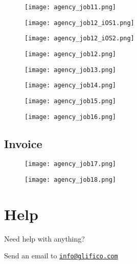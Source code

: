 \documentclass[11 pt, a4paper]{article}
\begin{document}
\begin{figure}[H]
\centering
\texttt{[image: agency\_job11.png]}
\end{figure}


\clearpage

\begin{figure}
\begin{minipage}{0.45\linewidth}
\centering
\texttt{[image: agency\_job12\_iOS1.png]}
\end{minipage}
\hspace{3mm}
\begin{minipage}{0.45\linewidth}
\centering
\texttt{[image: agency\_job12\_iOS2.png]}
\end{minipage}
\end{figure}

\begin{figure}[H]
\centering
\texttt{[image: agency\_job12.png]}
\end{figure}

\begin{figure}[H]
\centering
\texttt{[image: agency\_job13.png]}
\end{figure}


\clearpage
\begin{figure}[H]
\centering
\texttt{[image: agency\_job14.png]}
\end{figure}


\begin{figure}[H]
\centering
\texttt{[image: agency\_job15.png]}
\end{figure}


\clearpage
\begin{figure}[H]
\centering
\texttt{[image: agency\_job16.png]}
\end{figure}

\subsection{Invoice}

\begin{figure}[H]
\centering
\texttt{[image: agency\_job17.png]}
\end{figure}


\clearpage
\begin{figure}[H]
\centering
\texttt{[image: agency\_job18.png]}
\end{figure}



\clearpage
\section{Help}
Need help with anything?

Send an email to \href{mailto:info@glifico.com}{\nolinkurl{info@glifico.com}}
\end{document}
